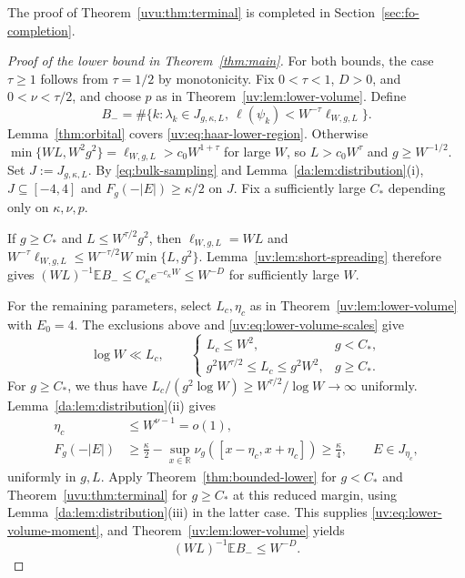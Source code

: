 \documentclass[11pt]{article}
\numberwithin{equation}{section}
\theoremstyle{remark}
\newcommand{\E}{\mathbb E}
\newcommand{\R}{\mathbb R}
\newcommand{\ellstar}{\ell_{W,g,L}}
\begin{document}
The proof of Theorem~\ref{uvu:thm:terminal} is completed in
Section~\ref{sec:fo-completion}.




\begin{proof}[Proof of the lower bound in Theorem~\ref{thm:main}]
For both bounds, the case $\tau\ge1$ follows from $\tau=1/2$ by monotonicity.
Fix $0<\tau<1$, $D>0$, and $0<\nu<\tau/2$, and choose
$p$ as in Theorem~\ref{uv:lem:lower-volume}. Define
\[
 B_-=\#\{k:\lambda_k\in J_{g,\kappa,L},\ \ell(\psi_k)<W^{-\tau}\ellstar\}.
\]
Lemma~\ref{thm:orbital} covers \eqref{uv:eq:haar-lower-region}.
Otherwise $\min\{WL,W^2g^2\}=\ellstar>c_0W^{1+\tau}$ for large $W$,
so $L>c_0W^\tau$ and $g\ge W^{-1/2}$.
Set $J:=J_{g,\kappa,L}$. By \eqref{eq:bulk-sampling} and
Lemma~\ref{da:lem:distribution}\textup{(i)}, $J\subseteq[-4,4]$ and
$F_g(-|E|)\ge\kappa/2$ on $J$.
Fix a sufficiently large $C_*$ depending only on $\kappa,\nu,p$.

If $g\ge C_*$ and $L\le W^{\tau/2}g^2$, then $\ellstar=WL$ and
$W^{-\tau}\ellstar\le W^{-\tau/2}W\min\{L,g^2\}$.
Lemma~\ref{uv:lem:short-spreading} therefore gives
$(WL)^{-1}\E B_-\le C_\kappa e^{-c_\kappa W}\le W^{-D}$
for sufficiently large $W$.

For the remaining parameters, select $L_c,\eta_c$ as in
Theorem~\ref{uv:lem:lower-volume} with $E_0=4$.
The exclusions above and \eqref{uv:eq:lower-volume-scales} give
\[
 \log W\ll L_c,\qquad
 \begin{cases}
 L_c\le W^2,&g<C_*,\\
 g^2W^{\tau/2}\le L_c\le g^2W^2,&g\ge C_*.
 \end{cases}
\]
For $g\ge C_*$, we thus have
$L_c/(g^2\log W)\ge W^{\tau/2}/\log W\to\infty$ uniformly.
Lemma~\ref{da:lem:distribution}\textup{(ii)} gives
\[
 \begin{aligned}
 \eta_c&\le W^{\nu-1}=o(1),\\
 F_g(-|E|)&\ge\frac\kappa2-\sup_{x\in\R}
 \nu_g([x-\eta_c,x+\eta_c])\ge\frac\kappa4,
 \qquad E\in J_{\eta_c},
 \end{aligned}
\]
uniformly in $g,L$. Apply Theorem~\ref{thm:bounded-lower} for $g<C_*$
and Theorem~\ref{uvu:thm:terminal} for $g\ge C_*$ at this reduced margin,
using Lemma~\ref{da:lem:distribution}\textup{(iii)} in the latter case.
This supplies \eqref{uv:eq:lower-volume-moment}, and
Theorem~\ref{uv:lem:lower-volume} yields
\begin{equation}\label{uv:eq:lower-regions-output}
 (WL)^{-1}\E B_-\le W^{-D}.
\end{equation}
\end{proof}
\end{document}
